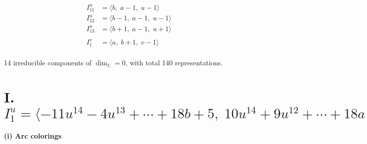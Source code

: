 \documentclass[1p]{elsarticle_modified}
\theoremstyle{definition}
\begin{document}
\begin{align*}
I^u_{11}&=\langle 
b,\;a-1,\;u-1\rangle \\
I^u_{12}&=\langle 
b-1,\;a-1,\;u-1\rangle \\
I^u_{13}&=\langle 
b+1,\;a-1,\;u+1\rangle \\
\\
I^v_{1}&=\langle 
a,\;b+1,\;v-1\rangle \\
\end{align*}
\raggedright * 14 irreducible components of $\dim_{\mathbb{C}}=0$, with total 140 representations.\\
\newpage
\renewcommand{\arraystretch}{1}
\centering \section*{I. $I^u_{1}= \langle -11 u^{14}-4 u^{13}+\cdots+18 b+5,\;10 u^{14}+9 u^{12}+\cdots+18 a-18,\;u^{15}+2 u^{13}+\cdots+6 u^3-1 \rangle$}
\flushleft \textbf{(i) Arc colorings}\\
\end{document}
